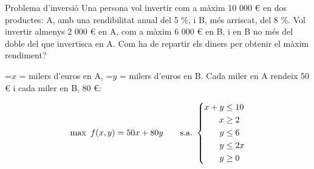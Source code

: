 \documentclass[11pt,a4paper]{article}
\newcommand{\fmm}[1]{\setbox0=\hbox{$#1$}\ifdim\wd0>\linewidth\fmdisp{#1}\else\mbox{\box0}\fi}
\newcommand{\fmdisp}[1]{\[\setbox2=\hbox{$\displaystyle #1$}\ifdim\wd2>\linewidth\resizebox{\linewidth}{!}{\box2}\else\box2\fi\]}
\begin{document}
\begin{fmex}{Problema d'inversió}
Una persona vol invertir com a màxim 10 000 € en dos productes: A, amb una rendibilitat anual del 5 \%, i B, més arriscat, del 8 \%. Vol invertir almenys 2 000 € en A, com a màxim 6 000 € en B, i en B no més del doble del que invertisca en A. Com ha de repartir els diners per obtenir el màxim rendiment?

\fmm{x} = milers d'euros en A, \fmm{y} = milers d'euros en B. Cada miler en A rendeix 50 € i cada miler en B, 80 €:

\fmdisp{\max\ f(x,y)=50x+80y\qquad\text{s.a.}\ \left\{\begin{aligned}x+y&\leq10\\ x&\geq2\\ y&\leq6\\ y&\leq2x\\ y&\geq0\end{aligned}\right.}


\end{fmex}
\end{document}
